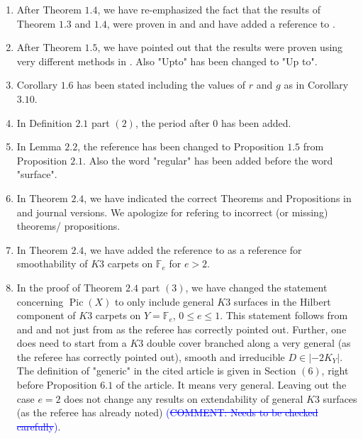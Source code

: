 \documentclass[11pt,twoside]{amsart}
\theoremstyle{plain}
\numberwithin{equation}{section}
\theoremstyle{definition}
\begin{document}
\begin{enumerate}

\item[$(1)$] After Theorem $1.4$, we have re-emphasized the fact that the results of Theorem $1.3$ and $1.4$, were proven in \cite{CLM93} and \cite{CLM98} and have added a reference to \cite{CLM98c}. 

\item[$(2)$] After Theorem $1.5$, we have pointed out that the results were proven using very different methods in \cite{CLM98}. Also "Upto" has been changed to "Up to".

\item[$(3)$] Corollary $1.6$ has been stated including the values of $r$ and $g$ as in Corollary $3.10$. 

\item[$(4)$] In Definition $2.1$ part $(2)$, the period after $0$ has been added. 

\item[$(5)$] In Lemma $2.2$, the reference has been changed to Proposition $1.5$ from Proposition $2.1$. Also the word "regular" has been added before the word "surface".

\item[$(6)$] In Theorem $2.4$, we have indicated the correct Theorems and Propositions in \cite{BMR21} and \cite{GP97} journal versions. We apologize for refering to incorrect (or missing) theorems/ propositions.

\item[$(7)$] In Theorem $2.4$, we have added the reference to \cite[Theorem $4.4$]{BMR21} as a reference for smoothability of $K3$ carpets on $\mathbb{F}_e$ for $e > 2$.

\item[$(8)$]  In the proof of Theorem $2.4$ part $(3)$, we have changed the statement concerning $\operatorname{Pic}(X)$ to only include general $K3$ surfaces in the Hilbert component of $K3$ carpets on $Y = \mathbb{F}_e$, $0 \leq e \leq 1$. This statement follows from \cite[Proposition $6.3$]{AHL10} and \cite[Proposition $6.5$ (i), (iii)]{AHL10} and not just from \cite[Proposition $6.3$]{AHL10} as the referee has correctly pointed out. Further, one does need to start from a $K3$ double cover branched along a very general (as the referee has correctly pointed out), smooth and irreducible $D \in |-2K_Y|$. The definition of "generic" in the cited article is given in Section $(6)$, right before Proposition $6.1$ of the article. It means very general. Leaving out the case $e = 2$ does not change any results on extendability of general $K3$ surfaces (as the referee has already noted) \textcolor{blue}{(\sout{COMMENT: Needs to be checked carefully})}. 


\end{enumerate}
\end{document}
